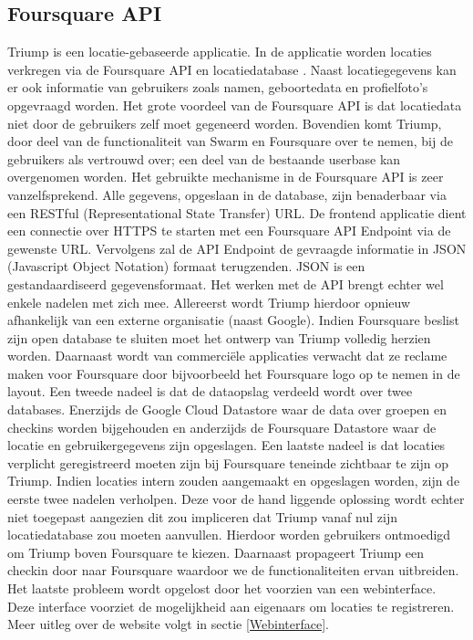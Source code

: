 \subsection{Foursquare API}
\label{Foursquare API}
Triump is een locatie-gebaseerde applicatie. In de applicatie worden locaties verkregen via de Foursquare API en locatiedatabase \cite{FS_API_website}. Naast locatiegegevens kan er ook informatie van gebruikers zoals namen, geboortedata en profielfoto's opgevraagd worden.
Het grote voordeel van de Foursquare API is dat locatiedata niet door de gebruikers zelf moet gegeneerd worden. Bovendien komt Triump, door deel van de functionaliteit van Swarm en Foursquare over te nemen, bij de gebruikers als vertrouwd over; een deel van de bestaande userbase kan overgenomen worden. 
Het gebruikte mechanisme in de Foursquare API is zeer vanzelfsprekend. Alle gegevens, opgeslaan in de database, zijn benaderbaar via een RESTful (Representational State Transfer) URL. De frontend applicatie dient een connectie over HTTPS te starten met een Foursquare API Endpoint via de gewenste URL. Vervolgens zal de API Endpoint de gevraagde informatie in JSON (Javascript Object Notation) formaat terugzenden. JSON is een gestandaardiseerd gegevensformaat.
Het werken met de API brengt echter wel enkele nadelen met zich mee.
Allereerst wordt Triump hierdoor opnieuw afhankelijk van een externe organisatie (naast Google). Indien Foursquare beslist zijn open database te sluiten moet het ontwerp van Triump volledig herzien worden. Daarnaast wordt van commerciële applicaties verwacht dat ze reclame maken voor Foursquare door bijvoorbeeld het Foursquare logo op te nemen in de layout.  Een tweede nadeel is dat de dataopslag verdeeld wordt over twee databases. Enerzijds de Google Cloud Datastore waar de data over groepen en checkins worden bijgehouden en anderzijds de Foursquare Datastore waar de locatie en gebruikergegevens zijn opgeslagen. Een laatste nadeel is dat locaties verplicht geregistreerd moeten zijn bij Foursquare teneinde zichtbaar te zijn op Triump. 
Indien locaties intern zouden aangemaakt en opgeslagen worden, zijn de eerste twee nadelen verholpen. Deze voor de hand liggende oplossing wordt echter niet toegepast aangezien dit zou impliceren dat Triump vanaf nul zijn locatiedatabase zou moeten aanvullen. Hierdoor worden gebruikers ontmoedigd om Triump boven Foursquare te kiezen. Daarnaast propageert Triump een checkin door naar Foursquare waardoor we de functionaliteiten ervan uitbreiden. 
Het laatste probleem wordt opgelost door het voorzien van een webinterface. Deze interface voorziet de mogelijkheid aan eigenaars om locaties te registreren. Meer uitleg over de website volgt in sectie \ref{Webinterface}.
